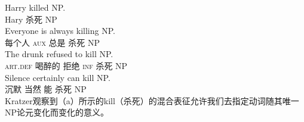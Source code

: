 \eal
\ex 
\gll Harry killed NP.\\
     Hary 杀死 NP\\
\ex 
\gll Everyone is always killing NP.\\
     每个人 \textsc{aux} 总是 杀死 NP\\
\ex 
\gll The drunk refused to kill NP.\\
     \textsc{art}.\textsc{def} 喝醉的 拒绝 \textsc{inf} 杀死 NP\\
\ex 
\gll Silence certainly can kill NP.\\
     沉默 当然 能 杀死 NP\\
\zl
Kratzer观察到（a）所示的kill（杀死）的混合表征允许我们去指定动词随其唯一NP论元变化而变化的意义。

